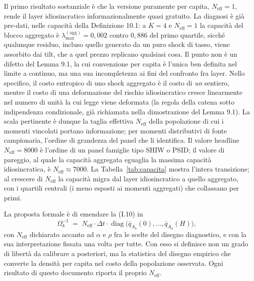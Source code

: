 \documentclass[11pt,a4paper]{article}
\newcommand{\diag}{\operatorname{diag}}
\newcommand{\Neff}{N_{\mathrm{eff}}}
\begin{document}
Il primo risultato sostanziale \`e che la versione puramente per capita, $\Neff=1$, rende il layer idiosincratico informazionalmente quasi gratuito. La diagnosi \`e gi\`a pre-dati, nelle capacit\`a della Definizione 10.1: a $K=4$ e $\Neff=1$ la capacit\`a del blocco aggregato \`e $\lambda_{\max}^{(\mathrm{agg})}=0{,}002$ contro $0{,}886$ del primo quartile, sicch\'e qualunque residuo, incluso quello generato da un puro shock di tasso, viene assorbito dai tilt, che a quel prezzo replicano qualsiasi cosa. Il punto non \`e un difetto del Lemma 9.1, la cui convenzione per capita \`e l'unica ben definita nel limite a continuo, ma una sua incompletezza ai fini del confronto fra layer. Nello specifico, il costo entropico di uno shock aggregato \`e il costo di \emph{un} sentiero, mentre il costo di una deformazione del rischio idiosincratico cresce linearmente nel numero di unit\`a la cui legge viene deformata (la regola della catena sotto indipendenza condizionale, gi\`a richiamata nella dimostrazione del Lemma 9.1). La scala pertinente \`e dunque la taglia effettiva $\Neff$ della popolazione di cui i momenti vincolati portano informazione; per momenti distributivi di fonte campionaria, l'ordine di grandezza del panel che li identifica. Il valore headline $\Neff=8000$ \`e l'ordine di un panel famiglie tipo SHIW o PSID; il valore di pareggio, al quale la capacit\`a aggregata eguaglia la massima capacit\`a idiosincratica, \`e $\Neff\approx7000$. La Tabella~\ref{tab:capacita} mostra l'intera transizione; al crescere di $\Neff$ la capacit\`a migra dal layer idiosincratico a quello aggregato, con i quartili centrali (i meno esposti ai momenti aggregati) che collassano per primi.

La proposta formale \`e di emendare la (I.10) in
\begin{equation}\label{eq:pinningN}
\Omega_k^{-1}\;=\;\Neff\cdot\Delta t\cdot\diag\bigl(\bar q_{A_k}(0),\dots,\bar q_{A_k}(H)\bigr),
\end{equation}
con $\Neff$ dichiarato accanto ad $\alpha$ e $\rho$ fra le scelte del disegno diagnostico, e con la sua interpretazione fissata una volta per tutte. Con esso si definisce non un grado di libert\`a da calibrare a posteriori, ma la statistica del disegno empirico che converte la densit\`a per capita nel costo della popolazione osservata. Ogni risultato di questo documento riporta il proprio $\Neff$.
\end{document}
